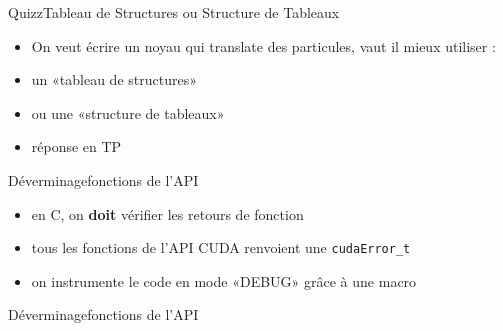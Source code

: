 \documentclass[11pt,mathserif]{beamer}
\newcommand{\scout}{\faAngellist}
\newcommand{\galde}{\faQuestion}
\newcommand{\hand}{\faHandORight}
\newcommand{\argi}{\faLightbulbO}
\newcommand{\pozik}{\faSmileO}
\newcommand{\adibi}{\faCommentO}
\begin{document}
\begin{frame}{Quizz}{Tableau de Structures ou Structure de Tableaux}
  \begin{itemize}[<+->]
    \item[\adibi] On veut écrire un noyau qui translate des particules, vaut il mieux utiliser : 
    \item[\galde] un «tableau de structures»
\begin{center}
  
\end{center}
    \item[\galde] ou une «structure de tableaux»
\begin{center}
  
\end{center}
  \item[\hand] réponse en TP \pozik
  \end{itemize}
\end{frame}

\begin{frame}{Déverminage}{fonctions de l'API}
  \begin{itemize}[<+->]
    \item[\adibi] en C, on {\bf doit} vérifier les retours de fonction 
\begin{center}
  
\end{center}
    \item[\argi] tous les fonctions de l'API CUDA renvoient une \texttt{cudaError\_t}
    \item[\scout] on instrumente le code en mode «DEBUG» grâce à une macro
\begin{center}
  
\end{center}
  \end{itemize}
\end{frame}

\begin{frame}{Déverminage}{fonctions de l'API}
\begin{center}
  
\end{center}
\end{frame}
\end{document}
